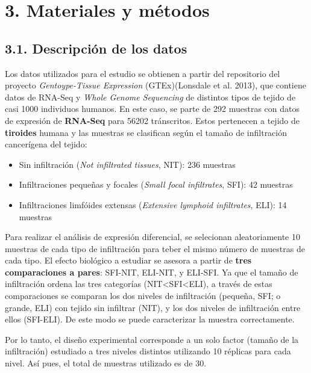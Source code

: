\documentclass[
]{article}
\providecommand{\tightlist}{%
  \setlength{\itemsep}{0pt}\setlength{\parskip}{0pt}}
\begin{document}
\hypertarget{materiales-y-muxe9todos}{%
\section{3. Materiales y métodos}\label{materiales-y-muxe9todos}}

\hypertarget{descripciuxf3n-de-los-datos}{%
\subsection{3.1. Descripción de los
datos}\label{descripciuxf3n-de-los-datos}}

Los datos utilizados para el estudio se obtienen a partir del
repositorio del proyecto \emph{Gentoype-Tissue Expression}
(GTEx)(Lonsdale et al. 2013), que contiene datos de RNA-Seq y
\emph{Whole Genome Sequencing} de distintos tipos de tejido de casi 1000
individuos humanos. En este caso, se parte de 292 muestras con datos de
expresión de \textbf{RNA-Seq} para 56202 tránscritos. Estos pertenecen a
tejido de \textbf{tiroides} humana y las muestras se clasifican según el
tamaño de infiltración cancerígena del tejido:

\begin{itemize}
\tightlist
\item
  Sin infiltración (\emph{Not infiltrated tissues}, NIT): 236 muestras
\item
  Infiltraciones pequeñas y focales (\emph{Small focal infiltrates},
  SFI): 42 muestras
\item
  Infiltraciones limfóides extensas (\emph{Extensive lymphoid
  infiltrates}, ELI): 14 muestras
\end{itemize}

Para realizar el análisis de expresión diferencial, se selecionan
aleatoriamente 10 muestras de cada tipo de infiltración para teber el
mismo número de muestras de cada tipo. El efecto biológico a estudiar se
asesora a partir de \textbf{tres comparaciones a pares}: SFI-NIT,
ELI-NIT, y ELI-SFI. Ya que el tamaño de infiltración ordena las tres
categorías (NIT\textless SFI\textless ELI), a través de estas
comparaciones se comparan los dos niveles de infiltración (pequeña, SFI;
o grande, ELI) con tejido sin infiltrar (NIT), y los dos niveles de
infiltración entre ellos (SFI-ELI). De este modo se puede caracterizar
la muestra correctamente.

Por lo tanto, el diseño experimental corresponde a un solo factor
(tamaño de la infiltración) estudiado a tres niveles distintos
utilizando 10 réplicas para cada nivel. Así pues, el total de muestras
utilizado es de 30.
\end{document}
